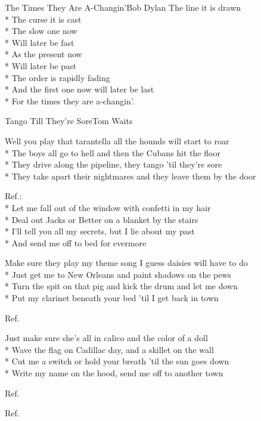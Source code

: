 \documentclass[10.5pt]{book}
\begin{document}
\begin{poem}{The Times They Are A-Changin'}{Bob Dylan}
The line it is drawn\\*
The curse it is cast\\*
The slow one now\\*
Will later be fast\\*
As the present now\\*
Will later be past\\*
The order is rapidly fading\\*
And the first one now will later be last\\*
For the times they are a-changin'.

\end{poem}

\begin{poem}{Tango Till They're Sore}{Tom Waits}

\settowidth{\versewidth}{Make sure they play my theme song I guess daisies will have to do}

Well you play that tarantella all the hounds will start to roar\\*
The boys all go to hell and then the Cubans hit the floor\\*
They drive along the pipeline, they tango 'til they're sore\\*
They take apart their nightmares and they leave them by the door

Ref.:\\*
Let me fall out of the window with confetti in my hair\\*
Deal out Jacks or Better on a blanket by the stairs\\*
I'll tell you all my secrets, but I lie about my past\\*
And send me off to bed for evermore

Make sure they play my theme song I guess daisies will have to do\\*
Just get me to New Orleans and paint shadows on the pews\\*
Turn the spit on that pig and kick the drum and let me down\\*
Put my clarinet beneath your bed 'til I get back in town

Ref.

\vfill\eject

Just make sure she's all in calico and the color of a doll\\*
Wave the flag on Cadillac day, and a skillet on the wall\\*
Cut me a switch or hold your breath 'til the sun goes down\\*
Write my name on the hood, send me off to another town

Ref.

Ref.

\end{poem}
\end{document}
